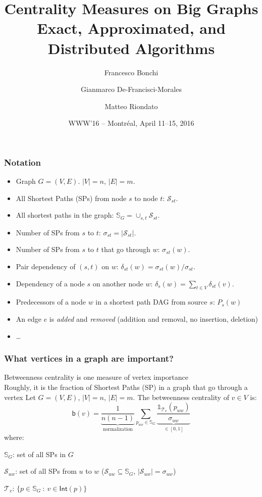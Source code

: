 \documentclass[aspectratio=169]{beamer}
\title{Centrality Measures on Big Graphs\\Exact, Approximated, and Distributed Algorithms}
\author[Bonchi, De-Francisci-Morales, Riondato]{Francesco Bonchi\inst{1} \and
Gianmarco De-Francisci-Morales\inst{2} \and Matteo Riondato\inst{3}}
\date[WWW'16]{WWW'16 -- Montr\'eal, April 11--15, 2016}
\institute[ISI, Qatar Computing Research Institute, TwoSigma]{
  \inst{1} ISI Foundation
  \and
  \inst{2} Qatar Computing Research Institute
  \and
  \inst{3} Two Sigma Investments
}
\newcommand*{\betw}{\ensuremath{\mathsf{b}}\xspace}
\newcommand{\dep}{\ensuremath{\delta}\xspace}
\newcommand{\paths}{\ensuremath{\sigma}\xspace}
\newcommand{\pred}{\ensuremath{P}\xspace}
\newcommand{\spath}{\ensuremath{\mathcal{S}}\xspace}
\newcommand{\allspath}{\ensuremath{\mathbb{S}\xspace}}
\begin{document}
\begin{frame}
  \titlepage
\end{frame}

\begin{frame}
  \frametitle{Notation}
  \begin{itemize}
    \item Graph $G=(V,E)$. $|V|=n$, $|E|=m$.
    \item All Shortest Paths (SPs) from node $s$ to node $t$: $\spath_{st}$.
    \item All shortest paths in the graph:
      $\allspath_G=\cup_{s,t}\spath_{st}$.
    \item Number of SPs from $s$ to $t$: $\paths_{st}=|\spath_{st}|$.
    \item Number of SPs from $s$ to $t$ that go through $w$: $\paths_{st}(w)$.
    \item Pair dependency of $(s,t)$ on $w$:
      $\dep_{st}(w)=\paths_{st}(w)/\paths_{st}$.
    \item Dependency of a node $s$ on another node $w$:
      $\dep_s(w)=\sum_{t \in V}\dep_{st}(v)$.
    \item Predecessors of a node $w$ in a shortest path DAG from source $s$:
      $\pred_s(w)$
    \item An edge $e$ is \emph{added} and \emph{removed} (addition and removal, no insertion, deletion)
    \item \ldots
  \end{itemize}
\end{frame}

\begin{frame}
  \frametitle{What vertices in a graph are important?}
  Betweenness centrality is one measure of vertex importance\\
  \quad Roughly, it is the fraction of Shortest Paths (SP) in a graph that go through a vertex
  \vfill
  Let $G=(V,E)$, $|V|=n$, $|E|=m$. The betweenness centrality of $v\in V$ is:
  \[
    \betw(v)=\underbrace{\frac{1}{n(n-1)}}_{\mbox{normalization}}\sum_{p_{uw}\in\mathbb{S}_G}
    \underbrace{\frac{\mathds{1}_{\mathcal{T}_v}(p_{uw})}{\sigma_{uw}}}_{\in [0,1]}
  \]
  where:
  \begin{itemize*}
    \item $\mathbb{S}_G$: set of all SPs in $G$
    \item $\mathcal{S}_{uw}$: set of all SPs from $u$ to $w$
      ($\mathcal{S}_{uw}\subseteq\mathbb{S}_G$,
      $|\mathcal{S}_{uw}|=\sigma_{uw}$)
    \item $\mathcal{T}_v$: $\{p\in\mathbb{S}_G ~:~ v\in\mathsf{Int}(p)\}$
  \end{itemize*}
\end{frame}
\end{document}
